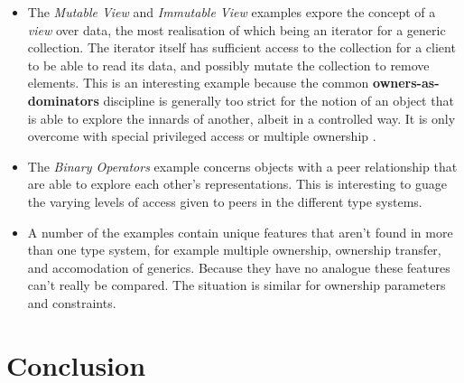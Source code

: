 \documentclass{acm_proc_article-sp}
\begin{document}
\begin{itemize}

    \item The \textit{Mutable View} and \textit{Immutable View} examples expore
        the concept of a \textit{view} over data, the most realisation of which
        being an iterator for a generic collection. The iterator itself has
        sufficient access to the collection for a client to be able to read its
        data, and possibly mutate the collection to remove elements. This is an
        interesting example because the common \textbf{owners-as-dominators}
        discipline is generally too strict for the notion of an object that is
        able to explore the innards of another, albeit in a controlled way. It
        is only overcome with special privileged access
        \cite{boyapati04safejava} or multiple ownership \cite{cameron07mojo}.

    \item The \textit{Binary Operators} example concerns objects with a peer
        \cite{dietl11gut} relationship that are able to explore each other's
        representations. This is interesting to guage the varying levels of
        access given to peers in the different type systems.

    \item A number of the examples contain unique features that aren't found in
        more than one type system, for example multiple ownership, ownership
        transfer, and accomodation of generics. Because they have no analogue
        these features can't really be compared. The situation is similar for
        ownership parameters and constraints.

\end{itemize}

\section{Conclusion}
\label{sec:conclude}





\lipsum[12]
\end{document}
